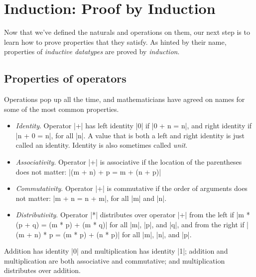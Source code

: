 \documentclass{memoir}
\begin{document}
\section{Induction: Proof by Induction}\label{PLFA--in--Lean----Part--1----Induction-005F-005F-005F--Proof--by--Induction}

\par
Now that we've defined the naturals and operations on them, our next step is to
learn how to prove properties that they satisfy. As hinted by their name,
properties of \emph{inductive datatypes} are proved by \emph{induction}.

\par

\subsection{Properties of operators}\label{PLFA--in--Lean----Part--1----Induction-005F-005F-005F--Proof--by--Induction----Properties--of--operators}

\par
Operations pop up all the time, and mathematicians have agreed on names for some
of the most common properties.

\par
\par\noindent \begin{itemize}
\item \emph{Identity}. Operator \LeanVerb|+| has left identity \LeanVerb|0| if \LeanVerb|0 + n = n|, and right
identity if \LeanVerb|n + 0 = n|, for all \LeanVerb|n|. A value that is both a left and right
identity is just called an identity. Identity is also sometimes called \emph{unit}.
\item \emph{Associativity}. Operator \LeanVerb|+| is associative if the location of the parentheses
does not matter: \LeanVerb|(m + n) + p = m + (n + p)|
\item \emph{Commutativity}. Operator \LeanVerb|+| is commutative if the order of arguments does not
matter: \LeanVerb|m + n = n + m|, for all \LeanVerb|m| and \LeanVerb|n|.
\item \emph{Distributivity}. Operator \LeanVerb|*| distributes over operator \LeanVerb|+| from the left if
\LeanVerb|m * (p + q) = (m * p) + (m * q)| for all \LeanVerb|m|, \LeanVerb|p|, and \LeanVerb|q|, and from the right
if \LeanVerb|(m + n) * p = (m * p) + (n * p)| for all \LeanVerb|m|, \LeanVerb|n|, and \LeanVerb|p|.

\end{itemize}
Addition has identity \LeanVerb|0| and multiplication has identity \LeanVerb|1|; addition and
multiplication are both associative and commutative; and multiplication
distributes over addition.
\end{document}
